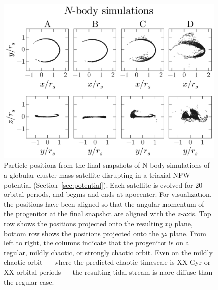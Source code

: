 \documentclass[letterpaper,12pt,preprint]{aastex}
\begin{document}
\begin{figure}[p]
\begin{center}
\includegraphics[width=\textwidth]{figures/nbody.png}
\caption{Particle positions from the final snapshots of N-body simulations of a globular-cluster-mass satellite disrupting in a triaxial NFW potential (Section~\ref{sec:potential}). Each satellite is evolved for 20 orbital periods, and begins and ends at apocenter. For visualization, the positions have been aligned so that the angular momentum of the progenitor at the final snapshot are aligned with the $z$-axis. Top row shows the positions projected onto the resulting $xy$ plane, bottom row shows the positions projected onto the $yz$ plane. From left to right, the columns indicate that the progenitor is on a regular, mildly chaotic, or strongly chaotic orbit. Even on the mildly chaotic orbit --- where the predicted chaotic timescale is XX Gyr or XX orbital periods --- the resulting tidal stream is more diffuse than the regular case. } \label{fig:nbodysims}
\end{center}
\end{figure}
\end{document}
